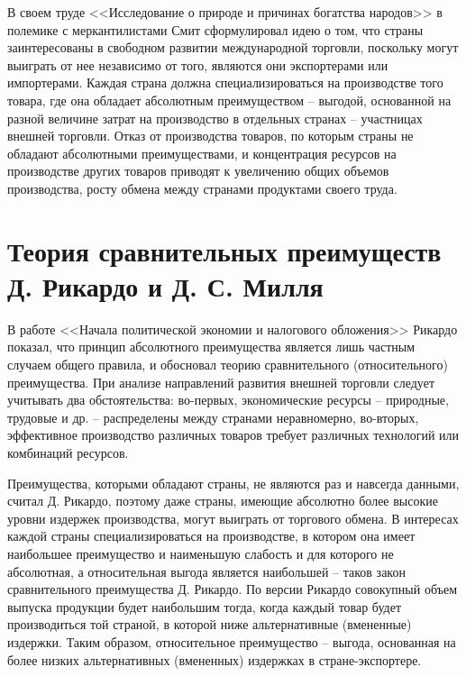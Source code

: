 В своем труде <<Исследование о природе и причинах богатства народов>> в
полемике с меркантилистами Смит сформулировал идею о том, что страны
заинтересованы в свободном развитии международной торговли, поскольку могут
выиграть от нее независимо от того, являются они экспортерами или импортерами.
Каждая страна должна специализироваться на производстве того товара, где она
обладает абсолютным преимуществом -- выгодой, основанной на разной величине
затрат на производство в отдельных странах -- участницах внешней торговли.
Отказ от производства товаров, по которым страны не обладают абсолютными
преимуществами, и концентрация ресурсов на производстве других товаров приводят
к увеличению общих объемов производства, росту обмена между странами продуктами
своего труда.

\vspace*{2em} %

\section{Теория сравнительных преимуществ Д. Рикардо и Д. С. Милля}

В работе <<Начала политической экономии и налогового обложения>> Рикардо
показал, что принцип абсолютного преимущества является лишь частным случаем
общего правила, и обосновал теорию сравнительного (относительного)
преимущества. При анализе направлений развития внешней торговли следует
учитывать два обстоятельства: во-первых, экономические ресурсы -- природные,
трудовые и др. -- распределены между странами неравномерно, во-вторых,
эффективное производство различных товаров требует различных технологий или
комбинаций ресурсов.

Преимущества, которыми обладают страны, не являются раз и навсегда данными,
считал Д. Рикардо, поэтому даже страны, имеющие абсолютно более высокие уровни
издержек производства, могут выиграть от торгового обмена. В интересах каждой
страны специализироваться на производстве, в котором она имеет наибольшее
преимущество и наименьшую слабость и для которого не абсолютная, а
относительная выгода является наибольшей -- таков закон сравнительного
преимущества Д. Рикардо. По версии Рикардо совокупный объем выпуска продукции
будет наибольшим тогда, когда каждый товар будет производиться той страной, в
которой ниже альтернативные (вмененные) издержки. Таким образом, относительное
преимущество -- выгода, основанная на более низких альтернативных (вмененных)
издержках в стране-экспортере.

